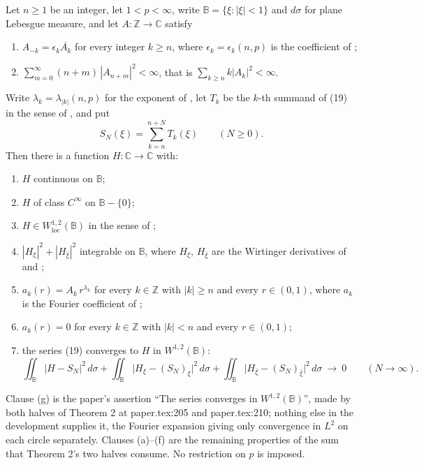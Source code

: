 \begin{lemma}
Let $n\ge1$ be an integer, let $1<p<\infty$, write $\mathbb{B}=\{\xi:|\xi|<1\}$
and $d\sigma$ for plane Lebesgue measure, and let
$A\colon\mathbb{Z}\to\mathbb{C}$ satisfy
\begin{enumerate}
\item[(C)] $A_{-k}=\epsilon_k\overline{A_k}$ for every integer $k\ge n$, where
  $\epsilon_k=\epsilon_k(n,p)$ is the coefficient of ;
\item[(S)] $\sum_{m=0}^{\infty}(n+m)\,|A_{n+m}|^2<\infty$, that is
  $\sum_{k\ge n}k|A_k|^2<\infty$.
\end{enumerate}
Write $\lambda_k=\lambda_{|k|}(n,p)$ for the exponent of ,
let $T_k$ be the $k$-th summand of (19) in the sense of , and
put
\[
  S_N(\xi)=\sum_{k=n}^{n+N}T_k(\xi)\qquad(N\ge0).
\]
Then there is a function $H\colon\mathbb{C}\to\mathbb{C}$ with:
\begin{enumerate}
\item[(a)] $H$ continuous on $\mathbb{B}$;
\item[(b)] $H$ of class $C^\infty$ on $\mathbb{B}-\{0\}$;
\item[(c)] $H\in W^{1,2}_{\mathrm{loc}}(\mathbb{B})$ in the sense of
  ;
\item[(d)] $|H_\xi|^2+|H_{\bar\xi}|^2$ integrable on $\mathbb{B}$, where
  $H_\xi$, $H_{\bar\xi}$ are the Wirtinger derivatives of  and
  ;
\item[(e)] $a_k(r)=A_k\,r^{\lambda_k}$ for every $k\in\mathbb{Z}$ with
  $|k|\ge n$ and every $r\in(0,1)$, where $a_k$ is the Fourier coefficient of
  ;
\item[(f)] $a_k(r)=0$ for every $k\in\mathbb{Z}$ with $|k|<n$ and every
  $r\in(0,1)$;
\item[(g)] the series (19) converges to $H$ in $W^{1,2}(\mathbb{B})$:
\[
  \iint_{\mathbb{B}}|H-S_N|^2\,d\sigma
  +\iint_{\mathbb{B}}\bigl|H_\xi-(S_N)_\xi\bigr|^2\,d\sigma
  +\iint_{\mathbb{B}}\bigl|H_{\bar\xi}-(S_N)_{\bar\xi}\bigr|^2\,d\sigma
  \ \longrightarrow\ 0\qquad(N\to\infty).
\]
\end{enumerate}

Clause (g) is the paper's assertion ``The series converges in
$W^{1,2}(\mathbb{B})$'', made by both halves of Theorem 2 at paper.tex:205 and
paper.tex:210; nothing else in the development supplies it, the Fourier
expansion giving only convergence in $L^2$ on each circle separately.  Clauses
(a)--(f) are the remaining properties of the sum that Theorem 2's two halves
consume.  No restriction on $p$ is imposed.
\end{lemma}
